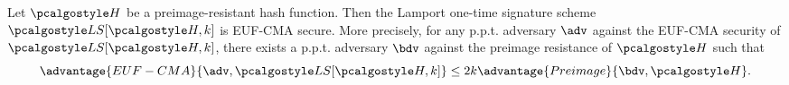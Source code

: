 \begin{theorem}\label{thm:ots-lamport-euf-cma}
    Let $\algo{H}$ be a preimage-resistant hash function.
    Then the Lamport one-time signature scheme $\algo{LS}[\algo{H, k}]$ is EUF-CMA secure.
    More precisely, for any p.p.t. adversary $\adv$ against the EUF-CMA security of $\algo{LS}[\algo{H, k}]$,
    there exists a p.p.t. adversary $\bdv$ against the preimage resistance of $\algo{H}$ such that
    \[
    \advantage{EUF-CMA}{\adv, \algo{LS}[\algo{H, k}]} \leq 2k\advantage{Preimage}{\bdv, \algo{H}}.
    \]
\end{theorem}

\begin{figure}[tbh]
 \begin{tcolorbox}%
  \begin{pchstack}[center]
  \begin{pcvstack}
   \pcvspace
  \end{pcvstack}
  \pchspace
   \begin{pcvstack}
\end{pcvstack}
\end{pchstack}
\end{tcolorbox}
\end{figure}
